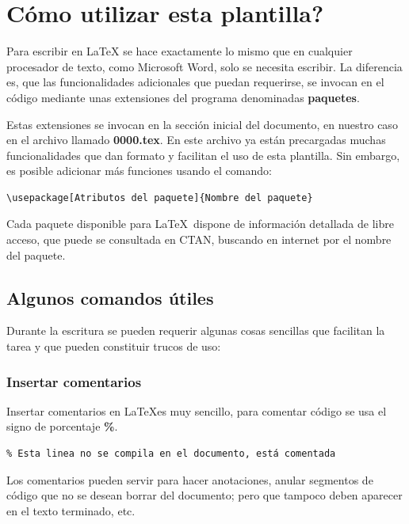 ﻿\chapter{Cómo utilizar esta plantilla?}
\par Para escribir en \LaTeX \; se hace exactamente lo mismo que en cualquier procesador de texto, como Microsoft Word, solo se necesita escribir. La diferencia es, que las funcionalidades adicionales que puedan requerirse, se invocan en el código mediante unas extensiones del programa denominadas \textbf{paquetes}.
\par Estas extensiones se invocan en la sección inicial del documento, en nuestro caso en el archivo llamado \textbf{0000.tex}. En este archivo ya están precargadas muchas funcionalidades que dan formato y facilitan el uso de esta plantilla. Sin embargo, es posible adicionar más funciones usando el comando:
\begin{verbatim}
\usepackage[Atributos del paquete]{Nombre del paquete}
\end{verbatim}
\par Cada paquete disponible para \LaTeX \, dispone de información detallada de libre acceso, que puede se consultada en CTAN, buscando en internet por el nombre del paquete.
\section{Algunos comandos útiles}
\par Durante la escritura se pueden requerir algunas cosas sencillas que facilitan la tarea y que pueden constituir trucos de uso:
\subsection{Insertar comentarios}
\par Insertar comentarios en \LaTeX es muy sencillo, para comentar código se usa el signo de porcentaje \textbf{\%}.
\begin{verbatim}
% Esta linea no se compila en el documento, está comentada
\end{verbatim}
\par Los comentarios pueden servir para hacer anotaciones, anular segmentos de código que no se desean borrar del documento; pero que tampoco deben aparecer en el texto terminado, etc.
\pagebreak
